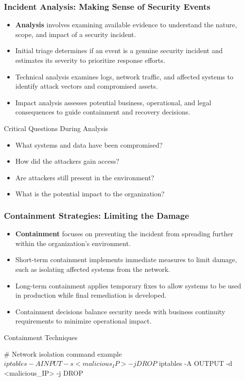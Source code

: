 \documentclass{beamer}
\begin{document}
\begin{frame}
\frametitle{Incident Analysis: Making Sense of Security Events}
\begin{itemize}
\item \textbf{Analysis} involves examining available evidence to understand the nature, scope, and impact of a security incident.
\item Initial triage determines if an event is a genuine security incident and estimates its severity to prioritize response efforts.
\item Technical analysis examines logs, network traffic, and affected systems to identify attack vectors and compromised assets.
\item Impact analysis assesses potential business, operational, and legal consequences to guide containment and recovery decisions.
\end{itemize}

\begin{alertblock}{Critical Questions During Analysis}
\begin{itemize}
\item What systems and data have been compromised?
\item How did the attackers gain access?
\item Are attackers still present in the environment?
\item What is the potential impact to the organization?
\end{itemize}
\end{alertblock}
\end{frame}

\begin{frame}[fragile]
\frametitle{Containment Strategies: Limiting the Damage}
\begin{itemize}
\item \textbf{Containment} focuses on preventing the incident from spreading further within the organization's environment.
\item Short-term containment implements immediate measures to limit damage, such as isolating affected systems from the network.
\item Long-term containment applies temporary fixes to allow systems to be used in production while final remediation is developed.
\item Containment decisions balance security needs with business continuity requirements to minimize operational impact.
\end{itemize}

\begin{exampleblock}{Containment Techniques}
\begin{semiverbatim}
# Network isolation command example
$ iptables -A INPUT -s <malicious_IP> -j DROP
$ iptables -A OUTPUT -d <malicious_IP> -j DROP
\end{semiverbatim}
\end{exampleblock}
\end{frame}
\end{document}
